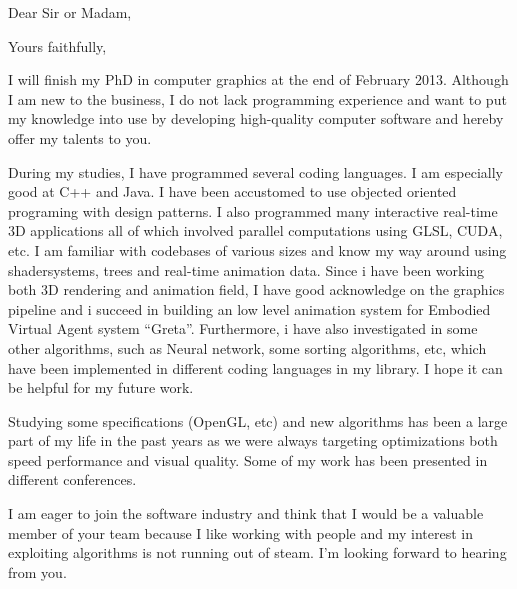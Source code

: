 \date{January 06, 2013}
\opening{Dear Sir or Madam,}
\closing{Yours faithfully,}

\makelettertitle

I will finish my PhD in computer graphics at the end of February 2013. 
Although I am new to the business, I do not lack programming experience and want to put my knowledge into use by developing high-quality computer software and hereby offer my talents to you.

During my studies, I have programmed several coding languages. 
I am especially good at C++ and Java. 
I have been accustomed to use objected oriented programing with design patterns.
I also programmed many interactive real-time 3D applications all of which involved parallel computations using GLSL, CUDA, etc. 
I am familiar with codebases of various sizes and know my way around using shadersystems, trees and real-time animation data. 
Since i have been working both 3D rendering and animation field, I have good acknowledge on the graphics pipeline and i succeed in building an low level animation system for Embodied Virtual Agent system ``Greta''.
Furthermore, i have also investigated in some other algorithms, such as Neural network, some sorting algorithms, etc, which have been implemented in different coding languages in my library.
I hope it can be helpful for my future work.

Studying some specifications (OpenGL, etc) and new algorithms has been a large part of my life in the past years as we were 
always targeting optimizations both speed performance and visual quality.
Some of my work has been presented in different conferences.

I am eager to join the software industry and think that I would be a valuable member of your 
team because I like working with people and my interest in exploiting algorithms is not 
running out of steam. 
I'm looking forward to hearing from you.

\makeletterclosing
